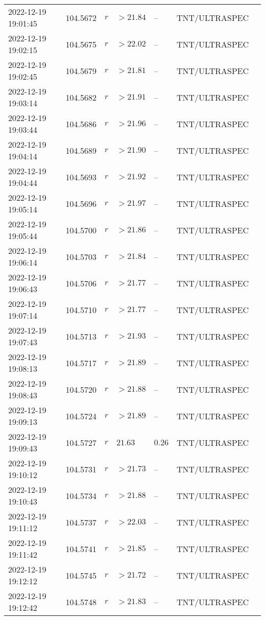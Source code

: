 \documentclass{nature_plusfigure}
\begin{document}
\begin{supplement}
\begin{center}
\begin{longtable}{lllllll}
2022-12-19 19:01:45 & 104.5672 & $r$ & $>21.84$ & -- & TNT/ULTRASPEC &  \\ 
2022-12-19 19:02:15 & 104.5675 & $r$ & $>22.02$ & -- & TNT/ULTRASPEC &  \\ 
2022-12-19 19:02:45 & 104.5679 & $r$ & $>21.81$ & -- & TNT/ULTRASPEC &  \\ 
2022-12-19 19:03:14 & 104.5682 & $r$ & $>21.91$ & -- & TNT/ULTRASPEC &  \\ 
2022-12-19 19:03:44 & 104.5686 & $r$ & $>21.96$ & -- & TNT/ULTRASPEC &  \\ 
2022-12-19 19:04:14 & 104.5689 & $r$ & $>21.90$ & -- & TNT/ULTRASPEC &  \\ 
2022-12-19 19:04:44 & 104.5693 & $r$ & $>21.92$ & -- & TNT/ULTRASPEC &  \\ 
2022-12-19 19:05:14 & 104.5696 & $r$ & $>21.97$ & -- & TNT/ULTRASPEC &  \\ 
2022-12-19 19:05:44 & 104.5700 & $r$ & $>21.86$ & -- & TNT/ULTRASPEC &  \\ 
2022-12-19 19:06:14 & 104.5703 & $r$ & $>21.84$ & -- & TNT/ULTRASPEC &  \\ 
2022-12-19 19:06:43 & 104.5706 & $r$ & $>21.77$ & -- & TNT/ULTRASPEC &  \\ 
2022-12-19 19:07:14 & 104.5710 & $r$ & $>21.77$ & -- & TNT/ULTRASPEC &  \\ 
2022-12-19 19:07:43 & 104.5713 & $r$ & $>21.93$ & -- & TNT/ULTRASPEC &  \\ 
2022-12-19 19:08:13 & 104.5717 & $r$ & $>21.89$ & -- & TNT/ULTRASPEC &  \\ 
2022-12-19 19:08:43 & 104.5720 & $r$ & $>21.88$ & -- & TNT/ULTRASPEC &  \\ 
2022-12-19 19:09:13 & 104.5724 & $r$ & $>21.89$ & -- & TNT/ULTRASPEC &  \\ 
2022-12-19 19:09:43 & 104.5727 & $r$ & $21.63$ & $0.26$ & TNT/ULTRASPEC &  \\ 
2022-12-19 19:10:12 & 104.5731 & $r$ & $>21.73$ & -- & TNT/ULTRASPEC &  \\ 
2022-12-19 19:10:43 & 104.5734 & $r$ & $>21.88$ & -- & TNT/ULTRASPEC &  \\ 
2022-12-19 19:11:12 & 104.5737 & $r$ & $>22.03$ & -- & TNT/ULTRASPEC &  \\ 
2022-12-19 19:11:42 & 104.5741 & $r$ & $>21.85$ & -- & TNT/ULTRASPEC &  \\ 
2022-12-19 19:12:12 & 104.5745 & $r$ & $>21.72$ & -- & TNT/ULTRASPEC &  \\ 
2022-12-19 19:12:42 & 104.5748 & $r$ & $>21.83$ & -- & TNT/ULTRASPEC &  \\ 

\end{longtable}
\end{center}
\end{supplement}
\end{document}
